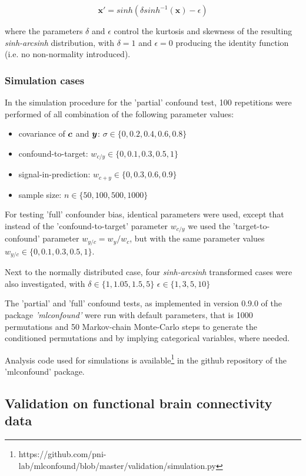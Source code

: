 \documentclass{article}
\begin{document}
$$\boldsymbol{x}' = sinh(\delta sinh^{-1}(\boldsymbol{x}) - \epsilon)$$

where the parameters $\delta$ and $\epsilon$ control the kurtosis and skewness of the resulting \emph{sinh-arcsinh} distribution, with $\delta=1$ and $\epsilon=0$ producing the identity function (i.e. no non-normality introduced).

\subsubsection*{Simulation cases}

In the simulation procedure for the 'partial' confound test, 100 repetitions were performed of all combination of the following parameter values: 
\begin{itemize}
    \item covariance of $\boldsymbol{c}$ and $\boldsymbol{y}$: $\sigma \in \{0, 0.2, 0.4, 0.6, 0.8\}$
    \item confound-to-target: $w_{c/y} \in \{0, 0.1, 0.3, 0.5, 1\}$
    \item signal-in-prediction: $w_{c+y} \in \{0, 0.3, 0.6, 0.9\}$
    \item sample size: $n \in \{50, 100, 500, 1000\}$
\end{itemize}

For testing 'full' confounder bias, identical parameters were used, except that instead of the 'confound-to-target' parameter $ w_{c/y}$ we used the 'target-to-confound' parameter $ w_{y/c} = w_y/ w_c $, but with the same parameter values $w_{y/c} \in \{0, 0.1, 0.3, 0.5, 1\}$.

Next to the normally distributed case, four \emph{sinh-arcsinh} transformed cases were also investigated, with $\delta \in \{1, 1.05, 1.5, 5\}$ $\epsilon \in \{1, 3, 5, 10\}$ 

The 'partial' and 'full' confound tests, as implemented in version 0.9.0 of the package \emph{'mlconfound'} were run with default parameters, that is 1000 permutations and 50 Markov-chain Monte-Carlo steps to generate the conditioned permutations and by implying categorical variables, where needed.

Analysis code used for simulations is available\footnote{https://github.com/pni-lab/mlconfound/blob/master/validation/simulation.py} in the github repository of the 'mlconfound' package.

\subsection{Validation on functional brain connectivity data}
\end{document}
